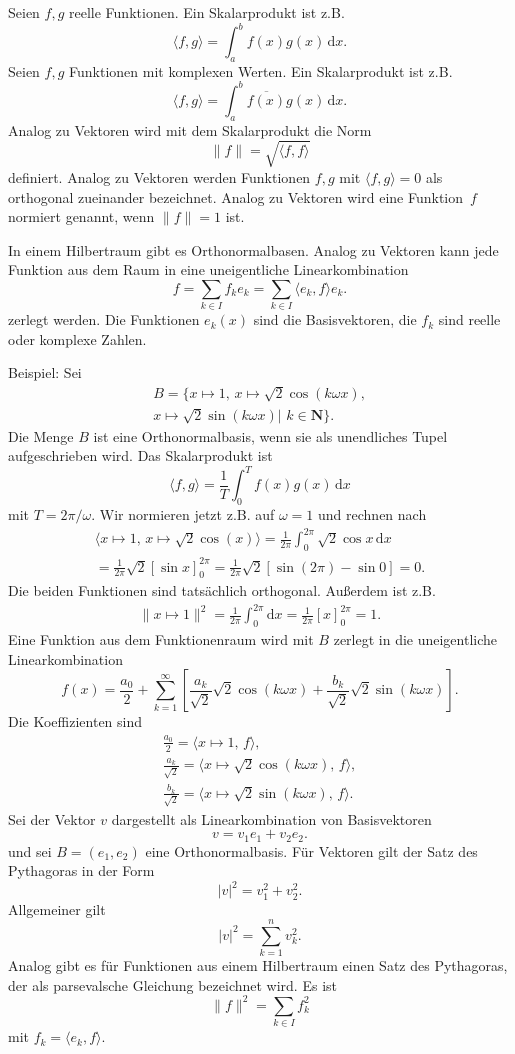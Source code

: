 \documentclass[a4paper,10pt,fleqn,twocolumn,twoside]{article}
\begin{document}
Seien $f,g$ reelle Funktionen. Ein Skalarprodukt ist z.B.
\[\langle f,g\rangle = \int_a^b f(x)g(x)\,\mathrm dx.\]
Seien $f,g$ Funktionen mit komplexen Werten.
Ein Skalarprodukt ist z.B.
\[\langle f,g\rangle = \int_a^b \overline{f(x)}g(x)\,\mathrm dx.\]
Analog zu Vektoren wird mit dem Skalarprodukt die Norm
\[\|f\| = \sqrt{\langle f,f\rangle}\]
definiert. Analog zu Vektoren werden Funktionen $f,g$ mit
$\langle f,g\rangle=0$ als orthogonal zueinander bezeichnet.
Analog zu Vektoren wird eine Funktion~$f$ normiert genannt,
wenn $\|f\|=1$ ist.

In einem Hilbertraum gibt es Orthonormalbasen. Analog zu Vektoren
kann jede Funktion aus dem Raum in eine uneigentliche
Linearkombination
\[f = \sum_{k\in I} f_ke_k = \sum_{k\in I} \langle e_k,f\rangle e_k.\]
zerlegt werden. Die Funktionen $e_k(x)$ sind die Basisvektoren,
die $f_k$ sind reelle oder komplexe Zahlen.

Beispiel: Sei
\begin{gather*}
B=\{x\mapsto 1,\,x\mapsto\sqrt{2}\cos(k\omega x),\\
x\mapsto\sqrt{2}\sin(k\omega x)|\,\,k\in\mathbf N\}.
\end{gather*}
Die Menge $B$ ist eine Orthonormalbasis, wenn sie als unendliches
Tupel aufgeschrieben wird. Das Skalarprodukt ist
\[\langle f,g\rangle = \frac{1}{T}\int_0^T f(x)g(x)\,\mathrm dx\]
mit $T=2\pi/\omega$. Wir normieren jetzt z.B. auf $\omega=1$ und
rechnen nach
\begin{gather*}
\langle x\mapsto 1,\,x\mapsto\sqrt{2}\cos(x)\rangle
= \frac{1}{2\pi}\int_0^{2\pi} \sqrt{2}\cos x\,\mathrm dx\\
= \frac{1}{2\pi}\sqrt{2}[\sin x]_0^{2\pi}
= \frac{1}{2\pi}\sqrt{2}[\sin(2\pi)-\sin 0] = 0.
\end{gather*}
Die beiden Funktionen sind tatsächlich orthogonal. Außerdem ist z.B.
\begin{gather*}
\|x\mapsto 1\|^2= \frac{1}{2\pi}\int_0^{2\pi} \mathrm dx
= \frac{1}{2\pi}[x]_0^{2\pi}=1.
\end{gather*}
Eine Funktion aus dem Funktionenraum wird mit $B$ zerlegt in die
uneigentliche Linearkombination
\[f(x) = \frac{a_0}{2}+\sum_{k=1}^\infty
[\frac{a_k}{\sqrt{2}}\sqrt{2}\cos(k\omega x)
+\frac{b_k}{\sqrt{2}}\sqrt{2}\sin(k\omega x)].\]
Die Koeffizienten sind
\begin{gather*}
\frac{a_0}{2}
= \langle x\mapsto 1,\,f\rangle,\\
\frac{a_k}{\sqrt{2}}
= \langle x\mapsto \sqrt{2}\cos(k\omega x),\,f\rangle,\\
\frac{b_k}{\sqrt{2}}
= \langle x\mapsto \sqrt{2}\sin(k\omega x),\,f\rangle.
\end{gather*}
%
Sei der Vektor $v$ dargestellt als Linearkombination von
Basisvektoren
\[v = v_1e_1+v_2e_2.\]
und sei $B=(e_1,e_2)$ eine Orthonormalbasis.
Für Vektoren gilt der Satz des Pythagoras in der Form
\[|v|^2 = v_1^2+v_2^2.\]
Allgemeiner gilt
\[|v|^2 = \sum_{k=1}^n v_k^2.\]
Analog gibt es für Funktionen aus einem Hilbertraum einen Satz des
Pythagoras, der als
parsevalsche Gleichung bezeichnet wird. Es ist
\[\|f\|^2 = \sum_{k\in I} f_k^2\]
mit $f_k=\langle e_k,f\rangle$.
\end{document}
